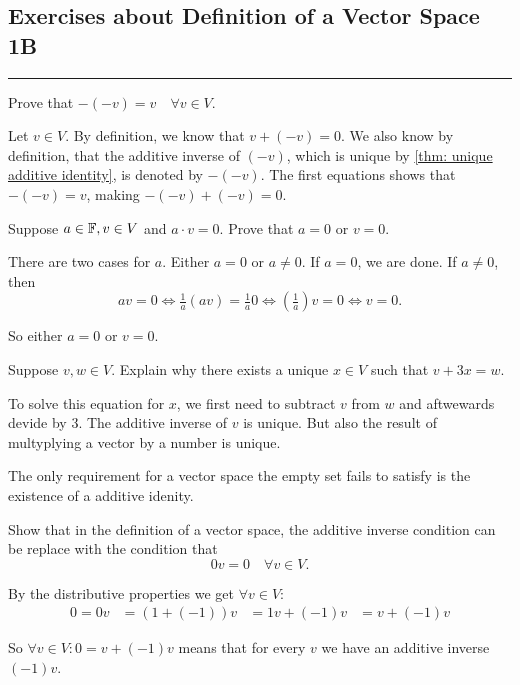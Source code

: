 \subsection*{Exercises about Definition of a Vector Space 1B}
\hrule
\phantom{.}

\begin{xrcs}
  Prove that $-(-v) = v \quad \forall v \in V$.

  \begin{prf}
    Let $v \in V$. By definition, we know that $v + (-v) = 0$. We also know by definition, that the additive inverse of $(-v)$, which is unique by \ref{thm: unique additive identity}, is denoted by $-(-v)$. The first equations shows that $-(-v) = v$, making $-(-v) + (-v) = 0$.
  \end{prf}
\end{xrcs}

\begin{xrcs}
  Suppose $a \in \mathbb{F}, v \in V$ and $a \cdot v = 0$. Prove that $a=0$ or $v=0$.

  \begin{prf}
    There are two cases for $a$. Either $a=0$ or $a\neq 0$. If $a=0$, we are done. If $a \neq 0$, then
    \[
    av=0 \iff \tfrac{1}{a}(av)=\tfrac{1}{a}0 \iff \left(\tfrac{1}{a} \right)v = 0 \iff v = 0.
    \]

    So either $a=0$ or $v=0$.
  \end{prf}
\end{xrcs}


\begin{xrcs}
  Suppose $v,w \in V$. Explain why there exists a unique $x \in V$ such that $v + 3x = w$.

   To solve this equation for $x$, we first need to subtract $v$ from $w$ and aftwewards devide by $3$. The additive inverse of $v$ is unique. But also the result of multyplying a vector by a number is unique.
\end{xrcs}

\begin{xrcs}
   The only requirement for a vector space the empty set fails to satisfy is the existence of a additive idenity.
\end{xrcs}

\begin{xrcs}
  Show that in the definition of a vector space, the additive inverse condition can be replace with the condition that
  \[
    0v = 0 \quad \forall v \in V.
  \]

  \begin{prf}
    By the distributive properties we get $\forall v \in V:$
    \[
    \begin{aligned}
      0 = 0v &= (1 + (-1))v
      &= 1v + (-1)v
      &= v + (-1)v
    \end{aligned}
    \]

    So $\forall v \in V: 0= v + (-1)v$ means that for every $v$ we have an additive inverse $(-1)v$.
  \end{prf}
\end{xrcs}
